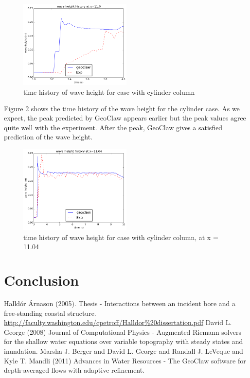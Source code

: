 \documentclass[11pt]{article}
\begin{document}
\begin{figure}[h!]
    \centering
    \includegraphics[width=0.5\textwidth]{./plots/waveheight_cylinder_x11}
    \caption{time history of wave height for case with cylinder column}
    \label{fig:waveheight_cylinder_x=11.0}
\end{figure}
\par
Figure \ref{fig:waveheight_cylinder_x=11.04} shows the time history of the wave height for the cylinder case. As we expect, the peak predicted by GeoClaw appears earlier but the peak values agree quite well with the experiment.
After the peak, GeoClaw gives a satisfied prediction of the wave height.
\begin{figure}[h!]
    \centering
    \includegraphics[width=0.5\textwidth]{./plots/waveheight_cylinder_x1104_largerTimeScale}
    \caption{time history of wave height for case with cylinder column, at x = 11.04}
    \label{fig:waveheight_cylinder_x=11.04}
\end{figure}

\section{Conclusion}\label{Sec:Conclusion}

{\footnotesize
\begin{thebibliography}{100}
 Halld\'or \'Arnason  (2005). Thesis - Interactions between an incident bore and a free-standing coastal structure. \url{http://faculty.washington.edu/cpetroff/Halldor%20dissertation.pdf}
 David L. George (2008) Journal of Computational Physics - Augmented Riemann solvers for the shallow water equations over variable topography with steady states and inundation.
 Marsha J. Berger and David L. George and Randall J. LeVeque and Kyle T. Mandli (2011) Advances in Water Resources - The GeoClaw software for depth-averaged flows with adaptive refinement.
\end{thebibliography}
}
\end{document}
